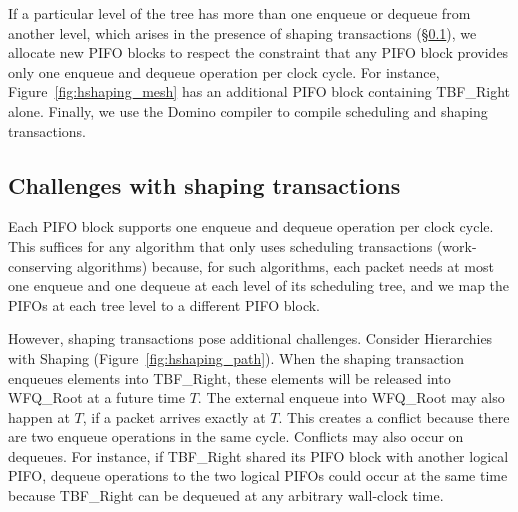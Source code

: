 If a particular level of the tree has more than one enqueue or dequeue from
another level, which arises in the presence of shaping transactions
(\S\ref{ss:shape_challenge}), we allocate new PIFO blocks to respect the
constraint that any PIFO block provides only one enqueue and dequeue operation
per clock cycle. For instance, Figure~\ref{fig:hshaping_mesh} has an additional
PIFO block containing TBF\_Right alone. Finally, we use the Domino compiler to
compile scheduling and shaping transactions.

\subsection{Challenges with shaping transactions}
\label{ss:shape_challenge}

Each PIFO block supports one enqueue and dequeue operation per clock cycle.
This suffices for any algorithm that only uses scheduling transactions
(work-conserving algorithms) because, for such algorithms, each packet needs at
most one enqueue and one dequeue at each level of its scheduling tree, and we
map the PIFOs at each tree level to a different PIFO block.

However, shaping transactions pose additional challenges. Consider Hierarchies
with Shaping (Figure~\ref{fig:hshaping_path}). When the shaping transaction
enqueues elements into TBF\_Right, these elements will be released into
WFQ\_Root at a future time $T$. The external enqueue into WFQ\_Root may also
happen at $T$, if a packet arrives exactly at $T$. This creates a conflict
because there are two enqueue operations in the same cycle.  Conflicts may also
occur on dequeues.  For instance, if TBF\_Right shared its PIFO block with
another logical PIFO, dequeue operations to the two logical PIFOs could occur
at the same time because TBF\_Right can be dequeued at any arbitrary wall-clock
time.


